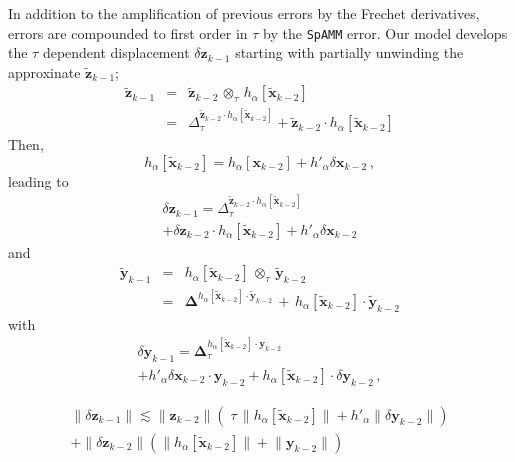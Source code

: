 \documentclass[letterpaper,twocolumn,amsmath,amsfont,amssymb,english,aps,jcp,preprintnumbers,groupaddress,nofootinbib,tightenlines]{revtex4}
\newcommand{\mat}[1]{\boldsymbol{#1}}
\newcommand{\ot}{ {\scriptstyle \otimes}_{ \tau } }
\begin{document}
In addition to the amplification of previous errors by the Frechet derivatives, errors are compounded to first order in $\tau$
by the {\tt SpAMM} error.  Our model develops the $\tau$  dependent displacement $\delta \mat{z}_{k-1}$ starting with partially unwinding
the approxinate  $\widetilde{\mat{z}}_{k-1}$;
\begin{eqnarray}
 \widetilde{\mat{z}}_{k-1} &=&  \widetilde{\mat{z}}_{k-2}  \, \ot \, h_\alpha[\widetilde{\mat{x}}_{k-2}]\\
&=& \Delta^{\widetilde{\mat{z}}_{k-2} \cdot h_\alpha \left[ \widetilde{\mat{x}}_{k-2}\right]}_\tau
+ \widetilde{\mat{z}}_{k-2} \cdot h_\alpha\left[ \widetilde{\mat{x}}_{k-2}\right]
\end{eqnarray}
Then,
\begin{equation}
  h_\alpha \left[ \widetilde{\mat{x}}_{k-2} \right]
=  h_\alpha \left[ \mat{x}_{k-2} \right] +  h'_\alpha  \delta \mat{x}_{k-2} \,  ,
\end{equation}
leading to
\begin{multline}
 \delta {\mat{z}}_{k-1} =\Delta^{\widetilde{\mat{z}}_{k-2} \cdot h_\alpha \left[ \widetilde{\mat{x}}_{k-2}\right]}_\tau
\\ +\delta \mat{z}_{k-2} \cdot h_\alpha \left[\widetilde{\mat{x}}_{k-2} \right]
+ h'_\alpha \delta \mat{x}_{k-2}
\end{multline}
and  
\begin{eqnarray}
\widetilde{\mat{y}}_{k-1}&=&
h_\alpha [ \widetilde{\mat{x}}_{k-2}] \, \ot \, \widetilde{\mat{y}}_{k-2}  \\
&=&  \mat{\Delta}^{  h_\alpha[ \widetilde{\mat{x}}_{k-2}] \cdot \widetilde{\mat{y}}_{k-2} }  \, + \,
     h_\alpha[ \widetilde{\mat{x}}_{k-2}] \cdot \widetilde{\mat{y}}_{k-2}
\end{eqnarray}
with
\begin{multline}
\delta \mat{y}_{k-1}= \mat{\Delta}^{
h_\alpha [ \widetilde{\mat{x}}_{k-2}] \cdot \mat{y}_{k-2} }_\tau  \\ +
h'_\alpha \delta \mat{x}_{k-2} \cdot \mat{y}_{k-2}
+ h_\alpha [ \widetilde{\mat{x}}_{k-2}] \cdot \delta \mat{y}_{k-2} \, ,
\end{multline}

\begin{multline}
\lVert \delta {\mat{z}}_{k-1} \rVert \lesssim
\lVert \mat{z}_{k-2} \rVert \left( \;  \tau \, \lVert h_\alpha \left[\widetilde{\mat{x}}_{k-2} \right]  \rVert
+ h'_\alpha \lVert \delta {\mat{y}}_{k-2} \rVert  \right)  \\ +
\lVert \delta {\mat{z}}_{k-2} \rVert  \left( \lVert h_\alpha \left[\widetilde{\mat{x}}_{k-2} \right]  \rVert +
\lVert  {\mat{y}}_{k-2} \rVert \right)
\end{multline}
\end{document}
